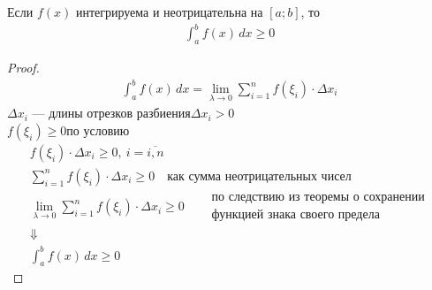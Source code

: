 \begin{theorem}
    Если $f(x)$ интегрируема и неотрицательна на $[a;b]$, то 
    \begin{gather*}
        \boxed{\int_{a}^{b} f(x)\, dx \geqslant 0}
    \end{gather*}
\end{theorem}
\begin{proof}
    \begin{gather*}
        \int_{a}^{b} f(x)\, dx = \lim_{\lambda\to 0} \sum_{i=1}^{n} f(\xi_i)\cdot \Delta x_i
    \end{gather*}
    $\Delta x_i$ --- длины отрезков разбиения\qquad $\Delta x_i > 0$ \\
    $f(\xi_i) \geqslant 0$\quad по условию
    \begin{gather*}
        f(\xi_i)\cdot \Delta x_i \geqslant 0,\ i = \overline{i, n}\\
        \sum_{i=1}^{n} f(\xi_i)\cdot \Delta x_i \geqslant 0\quad \text{как сумма неотрицательных чисел}\\
        \lim_{\lambda \to 0} \sum_{i=1}^{n} f(\xi_i) \cdot \Delta x_i \geqslant 0\quad \begin{aligned} &\text{по следствию из теоремы } \textit{о сохранении} \\ &\textit{функцией знака своего предела} \end{aligned}\\
        \Downarrow\\
        \int_{a}^{b} f(x)\, dx \geqslant 0
    \end{gather*}
\end{proof}

